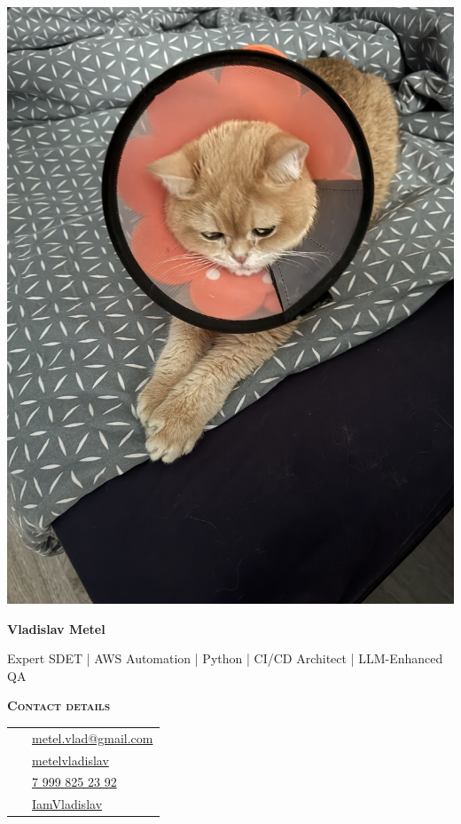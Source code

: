 \documentclass[10pt, a4paper]{article}
\newcommand{\headleft}[1]{\vspace*{2ex}\textsc{\textbf{#1}}\par%
	\vspace*{-1.5ex}\hrulefill\par\vspace*{0.7ex}}
\begin{document}
	
	\setlength{\topskip}{0pt}
	\setlength{\parindent}{0pt}
	\setlength{\parskip}{0pt}
	\setlength{\fboxsep}{0pt}
	\pagestyle{empty}
	\raggedbottom
	
	\begin{minipage}[t]{0.33\textwidth} %
		\colorbox{cvblue!90}{\color{white}  %
			\textwidth\relax%
			\begin{minipage}[t][297mm][t]{0.82\textwidth}
				\raggedright
				\vspace*{2ex} %
				\null\hfill\includegraphics[height=0.85\textwidth]{avatar.jpeg}\hfill\null

				
				\vspace*{1.5ex}
				
				\Large  \textbf{Vladislav Metel} \normalsize 
				
				\vspace*{1.5ex}
				
				Expert SDET | AWS Automation | Python | CI/CD Architect | LLM-Enhanced QA
				
				\headleft{Contact details}
				
				\begin{tabular}{ @{}c l }
					\Letter\ & \href{mailto:metel.vlad@gmail.com?subject=Job Opportunity}{metel.vlad@gmail.com} \\
					\faLinkedin\ & \href{https://www.linkedin.com/in/metelvladislav}{metelvladislav} \\
					\faMobile*\ & \href{tel:+7 999 825 23 92}{\raisebox{0.2ex}{+}7 999 825 23 92} \\
					\faGithub\ & \href{https://github.com/IamVladislav}{IamVladislav} \\
				\end{tabular}
				

\end{minipage}}
\end{minipage}
\end{document}
